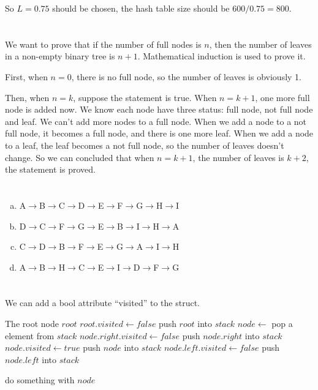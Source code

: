 \documentclass{article}
\begin{document}
So $L=0.75$ should be chosen, the hash table size should be $600/0.75=800$.

\section{}
We want to prove that if the number of full nodes is $n$, then  the number of leaves in a non-empty binary tree is $n+1$. Mathematical induction is used to prove it.

First, when $n=0$, there is no full node, so the number of leaves is obviously 1.

Then, when $n=k$, suppose the statement is true. When $n=k+1$, one more full node is added now. We know each node have three status: full node, not full node and leaf. We can't add more nodes to a full node. When we add a node to a not full node, it becomes a full node, and there is one more leaf. When we add a node to a leaf, the leaf becomes a not full node, so the number of leaves doesn't change. So we can concluded that when $n=k+1$, the number of leaves is $k+2$, the statement is proved.

\section{}
\begin{enumerate}[(a)]
\item A$\to$B$\to$C$\to$D$\to$E$\to$F$\to$G$\to$H$\to$I
\item D$\to$C$\to$F$\to$G$\to$E$\to$B$\to$I$\to$H$\to$A
\item C$\to$D$\to$B$\to$F$\to$E$\to$G$\to$A$\to$I$\to$H
\item A$\to$B$\to$H$\to$C$\to$E$\to$I$\to$D$\to$F$\to$G
\end{enumerate}

\section{}
We can add a bool attribute ``visited'' to the struct.
\begin{algorithm}[H]
    \begin{algorithmic}
        \Require The root node $root$
        \State $root.visited\gets false$
        \State push $root$ into $stack$
            \State $node\gets$ pop a element from $stack$
                    \State $node.right.visited\gets false$
                    \State push $node.right$ into $stack$
                \EndIf
                \State $node.visited\gets true$
                \State push $node$ into $stack$
                    \State $node.left.visited\gets false$
                    \State push $node.left$ into $stack$
                \EndIf
            
            \Else
            \State do something with $node$
            \EndIf
        \EndWhile
    \end{algorithmic}  
\end{algorithm}
\end{document}
